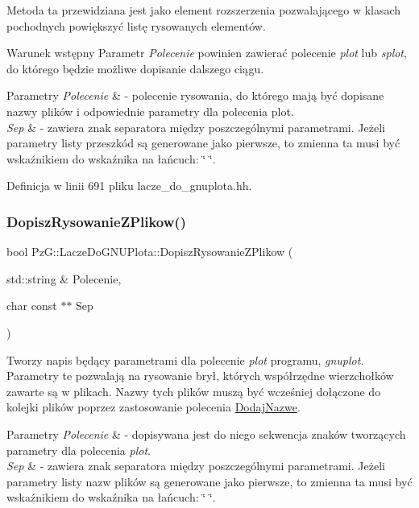 Metoda ta przewidziana jest jako element rozszerzenia pozwalającego w klasach pochodnych powiększyć listę rysowanych elementów. \begin{DoxyPrecond}{Warunek wstępny}
Parametr {\itshape Polecenie} powinien zawierać polecenie {\itshape plot} lub {\itshape splot}, do którego będzie możliwe dopisanie dalszego ciągu. 
\end{DoxyPrecond}

\begin{DoxyParams}{Parametry}
{\em Polecenie} & -\/ polecenie rysowania, do którego mają być dopisane nazwy plików i odpowiednie parametry dla polecenia plot. \\
\hline
{\em Sep} & -\/ zawiera znak separatora między poszczególnymi parametrami. Jeżeli parametry listy przeszkód są generowane jako pierwsze, to zmienna ta musi być wskaźnikiem do wskaźnika na łańcuch\+: \char`\"{} \char`\"{}. \\
\hline
\end{DoxyParams}


Definicja w linii 691 pliku lacze\+\_\+do\+\_\+gnuplota.\+hh.

\mbox{\label{class_pz_g_1_1_lacze_do_g_n_u_plota_ad3d7607946b82aa941d786dcd086d27e}} 
\subsubsection{\texorpdfstring{DopiszRysowanieZPlikow()}{DopiszRysowanieZPlikow()}}
{\footnotesize\ttfamily bool Pz\+G\+::\+Lacze\+Do\+G\+N\+U\+Plota\+::\+Dopisz\+Rysowanie\+Z\+Plikow (\begin{DoxyParamCaption}\item[{std\+::string \&}]{Polecenie,  }\item[{char const $\ast$$\ast$}]{Sep }\end{DoxyParamCaption})}

Tworzy napis będący parametrami dla polecenie {\itshape plot} programu, {\itshape gnuplot}. Parametry te pozwalają na rysowanie brył, których współrzędne wierzchołków zawarte są w plikach. Nazwy tych plików muszą być wcześniej dołączone do kolejki plików poprzez zastosowanie polecenia \mbox{\hyperlink{}{Dodaj\+Nazwe}}.


\begin{DoxyParams}{Parametry}
{\em Polecenie} & -\/ dopisywana jest do niego sekwencja znaków tworzących parametry dla polecenia {\itshape plot}. \\
\hline
{\em Sep} & -\/ zawiera znak separatora między poszczególnymi parametrami. Jeżeli parametry listy nazw plików są generowane jako pierwsze, to zmienna ta musi być wskaźnikiem do wskaźnika na łańcuch\+: \char`\"{} \char`\"{}. \\
\hline
\end{DoxyParams}

